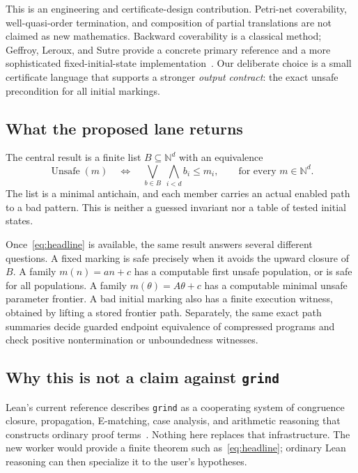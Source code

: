 \documentclass[11pt,a4paper]{article}
\newcommand{\N}{\mathbb N}
\newcommand{\Unsafe}{\operatorname{Unsafe}}
\newcommand{\grind}{\texttt{grind}}
\theoremstyle{definition}
\theoremstyle{remark}
\begin{document}
This is an engineering and certificate-design contribution. Petri-net coverability, well-quasi-order termination, and composition of partial translations are not claimed as new mathematics. Backward coverability is a classical method; Geffroy, Leroux, and Sutre provide a concrete primary reference and a more sophisticated fixed-initial-state implementation~\cite{occam}. Our deliberate choice is a small certificate language that supports a stronger \emph{output contract}: the exact unsafe precondition for all initial markings.

\subsection{What the proposed lane returns}
The central result is a finite list $B\subseteq\N^d$ with an equivalence
\begin{equation}\label{eq:headline}
 \Unsafe(m)\quad\Longleftrightarrow\quad
 \bigvee_{b\in B}\ \bigwedge_{i<d} b_i\le m_i,
 \qquad\text{for every }m\in\N^d.
\end{equation}
The list is a minimal antichain, and each member carries an actual enabled path to a bad pattern. This is neither a guessed invariant nor a table of tested initial states.

Once~\eqref{eq:headline} is available, the same result answers several different questions. A fixed marking is safe precisely when it avoids the upward closure of $B$. A family $m(n)=an+c$ has a computable first unsafe population, or is safe for all populations. A family $m(\theta)=A\theta+c$ has a computable minimal unsafe parameter frontier. A bad initial marking also has a finite execution witness, obtained by lifting a stored frontier path. Separately, the same exact path summaries decide guarded endpoint equivalence of compressed programs and check positive nontermination or unboundedness witnesses.

\subsection{Why this is not a claim against \grind}
Lean's current reference describes \grind{} as a cooperating system of congruence closure, propagation, E-matching, case analysis, and arithmetic reasoning that constructs ordinary proof terms~\cite{grind}. Nothing here replaces that infrastructure. The new worker would provide a finite theorem such as~\eqref{eq:headline}; ordinary Lean reasoning can then specialize it to the user's hypotheses.
\end{document}
